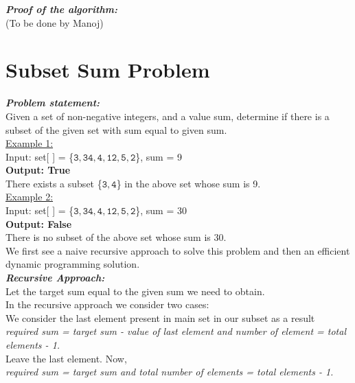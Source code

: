 \documentclass[12pt]{book}
\begin{document}
\textbf{\textit{Proof of the algorithm:}}\\
(To be done by Manoj)\\

\chapter{Subset Sum Problem}

\textbf{\textit{Problem statement:}}\\
Given a set of non-negative integers, and a value sum, determine if there is a subset of the given set with sum equal to given sum.\\

\underline{Example 1:}\\

Input: set[ ] = \{$\mathtt{3, 34, 4, 12, 5, 2}$\}, sum = 9\\
\textbf{    Output: True}\\

There exists a subset \{$\mathtt{3, 4}$\} in the above set whose sum is 9.\\

\underline{Example 2:}\\

Input: set[ ] = \{$\mathtt{3, 34, 4, 12, 5, 2}$\}, sum = 30\\
\textbf{    Output: False}\\

There is no subset of the above set whose sum is 30.\\

We first see a naive recursive approach to solve this problem and then an efficient dynamic programming solution.\\

\textbf{\textit{Recursive Approach:}}\\
Let the target sum equal to the given sum we need to obtain.\\

In the recursive approach we consider two cases:\\
We consider the last element present in main set in our subset as a result\\
\textit{required sum = target sum - value of last element and number of element = total elements - 1.}\\

Leave the last element. Now,\\
\textit{required sum = target sum and total number of elements = total elements - 1.}\\
\end{document}
